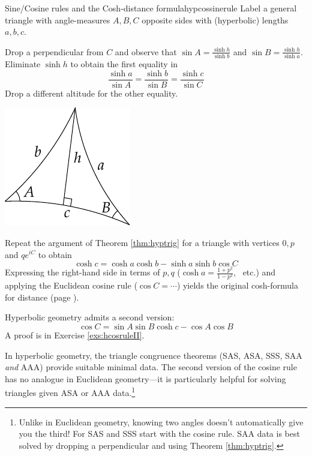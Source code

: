 \begin{cor}{Sine/Cosine rules and the Cosh-distance formula}{hypcossinerule}
	Label a general triangle with angle-measures $A,B,C$ opposite sides with (hyperbolic) lengths $a,b,c$.
	\begin{description}
		\begin{minipage}[t]{0.74\linewidth}\vspace{-8pt}
			\item[Sine Rule] Drop a perpendicular from $C$ and observe that $\sin A=\frac{\sinh h}{\sinh b}$ and $\sin B=\frac{\sinh h}{\sinh a}$. Eliminate $\sinh h$ to obtain the first equality in
			\[
				\frac{\sinh a}{\sin A}=\frac{\sinh b}{\sin B}=\frac{\sinh c}{\sin C}
			\]
			Drop a different altitude for the other equality.
		\end{minipage}
		\hfill
		\begin{minipage}[t]{0.25\linewidth}\vspace{-15pt}
			\flushright\includegraphics[scale=0.9]{isom-sine}
		\end{minipage}\par
			
		\item[Cosine Rule I] Repeat the argument of Theorem \ref{thm:hyptrig} for a triangle with vertices $0,p$ and $qe^{iC}$ to obtain
		\[
			\cosh c=\cosh a\cosh b-\sinh a\sinh b\cos C
		\]
		Expressing the right-hand side in terms of $p,q$ ($\cosh a=\frac{1+p^2}{1-p^2}$, \ etc.) and applying the Euclidean cosine rule ($\cos C=\cdots$) yields the original cosh-formula for distance (page \pageref{lemm:distformula}).
		\item[Cosine Rule II] Hyperbolic geometry admits a second version:
		\[
			\cos C=\sin A\sin B\cosh c-\cos A\cos B
		\]
		A proof is in Exercise \ref{exs:hcosruleII}.
	\end{description}
\end{cor}


In hyperbolic geometry, the triangle congruence theorems (SAS, ASA, SSS, SAA \emph{and} AAA) provide suitable minimal data. The second version of the cosine rule has no analogue in Euclidean geometry---it is particularly helpful for solving triangles given ASA or AAA data.\footnote{Unlike in Euclidean geometry, knowing two angles doesn't automatically give you the third! For SAS and SSS start with the cosine rule. SAA data is best solved by dropping a perpendicular and using Theorem \ref{thm:hyptrig}.}

